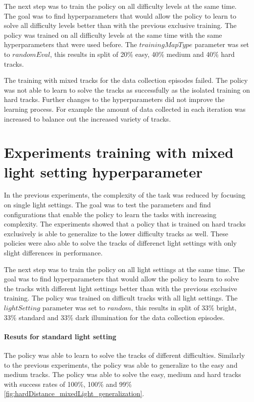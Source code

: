 The next step was to train the policy on all difficulty levels at the same time. The goal was to find hyperparameters that would allow the policy to learn to solve all difficulty levels better than with the previous exclusive training. The policy was trained on all difficulty levels at the same time with the same hyperparameters that were used before. The $trainingMapType$ parameter was set to $randomEval$, this results in split of 20\% easy, 40\% medium and 40\% hard tracks.

The training with mixed tracks for the data collection episodes failed. The policy was not able to learn to solve the tracks as successfully as the isolated training on hard tracks. Further changes to the hyperparameters did not improve the learning process. For example the amount of data collected in each iteration was increased to balance out the increased variety of tracks.


\section{Experiments training with mixed light setting hyperparameter}
\label{cha:experiment_mixed_light}

In the previous experiments, the complexity of the task was reduced by focusing on single light settings. The goal was to test the parameters and find configurations that enable the policy to learn the tasks with increasing complexity. The experiments showed that a policy that is trained on hard tracks exclusively is able to generalize to the lower difficulty tracks as well. These policies were also able to solve the tracks of differenct light settings with only slight differences in performance.


The next step was to train the policy on all light settings at the same time. The goal was to find hyperparameters that would allow the policy to learn to solve the tracks with different light settings better than with the previous exclusive training. The policy was trained on difficult tracks with all light settings. The $lightSetting$ parameter was set to $random$, this results in split of 33\% bright, 33\% standard and 33\% dark illumination for the data collection episodes.

\paragraph{Resuts for standard light setting}

The policy was able to learn to solve the tracks of different difficulties. Similarly to the previous experiments, the policy was able to generalize to the easy and medium tracks. The policy was able to solve the easy, medium and hard tracks with success rates of 100\%, 100\% and 99\% \ref{fig:hardDistance_mixedLight_generalization}. 

